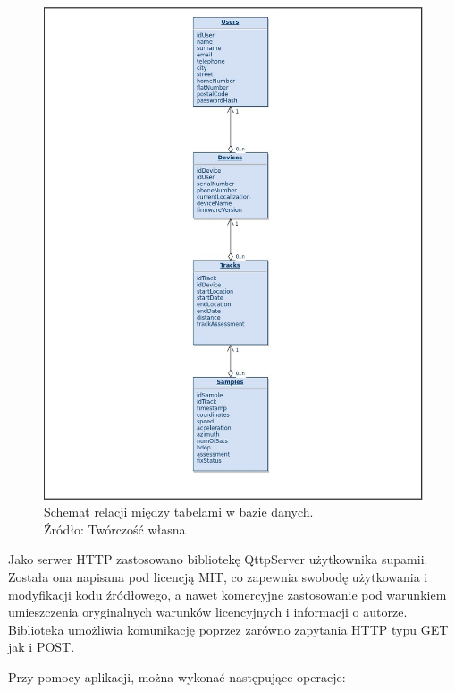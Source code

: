 \begin{figure}[H]
	\centering
	\includegraphics[width=17cm]{img/software/database/Database_relations.jpg}
	\caption{Schemat relacji między tabelami w bazie danych. 
	\\Źródło: Twórczość własna}
	\label{fig:image_soft_db_relations}
\end{figure}

Jako serwer HTTP zastosowano bibliotekę QttpServer użytkownika supamii\cite{qttpserver}. Została ona napisana pod licencją MIT, co zapewnia swobodę użytkowania i modyfikacji kodu źródłowego, a nawet komercyjne zastosowanie pod warunkiem umieszczenia oryginalnych warunków licencyjnych i informacji o autorze. Biblioteka umożliwia komunikację poprzez zarówno zapytania HTTP typu GET jak i POST. 

Przy pomocy aplikacji, można wykonać następujące operacje:

